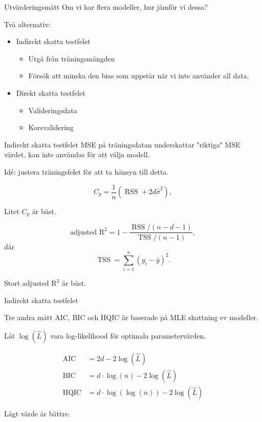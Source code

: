 \documentclass[10pt,english]{beamer}
\begin{document}
\begin{frame}{Utvärderingsmått}
    Om vi har flera modeller, hur jämför vi dessa?

    Två alternativ:
    \begin{itemize}
        \item Indirekt skatta testfelet
        \begin{itemize}
            \item Utgå från träningsmängden
            \item Försök att minska den bias som uppstår när vi inte använder all data.
        \end{itemize}
        \item Direkt skatta testfelet
        \begin{itemize}
            \item Valideringsdata
            \item Korsvalidering
        \end{itemize}
    \end{itemize}
\end{frame}

\begin{frame}{Indirekt skatta testfelet}
    MSE på träningsdatan underskattar "riktiga" MSE värdet, kan inte användas för att välja modell.

    Idé: justera träningsfelet för att ta hänsyn till detta. 

    \begin{equation*}
        C_p = \frac{1}{n} (\operatorname{RSS} + 2 d \hat{\sigma}^2),
    \end{equation*}

    Litet $C_p$ är bäst.

    \begin{equation*}
        \text{adjusted R}^2 = 1 - \frac{\operatorname{RSS}/(n-d-1)}{\operatorname{TSS}/(n-1)},
    \end{equation*}
    där
    \begin{equation*}
        \operatorname{TSS} = \sum_{i=1}^{n}(y_i - \bar{y})^2.
    \end{equation*}

    Stort $\text{adjusted R}^2$ är bäst.
\end{frame}

\begin{frame}{Indirekt skatta testfelet}
    
    Tre andra mått AIC, BIC och HQIC är baserade på MLE skattning ev modeller.

    Låt $\log(\hat{L})$ vara log-likelihood för optimala parametervärden.

    \begin{align*}
        \operatorname{AIC} &= 2 d - 2 \log(\hat{L}) \\
        \operatorname{BIC} &= d \cdot \log(n) - 2 \log(\hat{L}) \\
        \operatorname{HQIC} &= d \cdot \log(\log(n)) - 2 \log(\hat{L}) 
    \end{align*}

    Lågt värde är bättre.

\end{frame}
\end{document}
